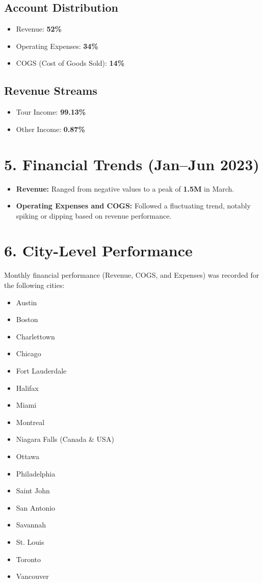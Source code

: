 \documentclass[12pt]{article}
\begin{document}
\subsection*{Account Distribution}
\begin{itemize}
    \item Revenue: \textbf{52\%}
    \item Operating Expenses: \textbf{34\%}
    \item COGS (Cost of Goods Sold): \textbf{14\%}
\end{itemize}

\subsection*{Revenue Streams}
\begin{itemize}
    \item Tour Income: \textbf{99.13\%}
    \item Other Income: \textbf{0.87\%}
\end{itemize}

\section*{5. Financial Trends (Jan--Jun 2023)}
\begin{itemize}
    \item \textbf{Revenue:} Ranged from negative values to a peak of \textbf{1.5M} in March.
    \item \textbf{Operating Expenses and COGS:} Followed a fluctuating trend, notably spiking or dipping based on revenue performance.
\end{itemize}

\section*{6. City-Level Performance}
Monthly financial performance (Revenue, COGS, and Expenses) was recorded for the following cities:
\begin{multicols}{2}
\begin{itemize}
    \item Austin
    \item Boston
    \item Charlettown
    \item Chicago
    \item Fort Lauderdale
    \item Halifax
    \item Miami
    \item Montreal
    \item Niagara Falls (Canada \& USA)
    \item Ottawa
    \item Philadelphia
    \item Saint John
    \item San Antonio
    \item Savannah
    \item St. Louis
    \item Toronto
    \item Vancouver
\end{itemize}
\end{multicols}
\end{document}
